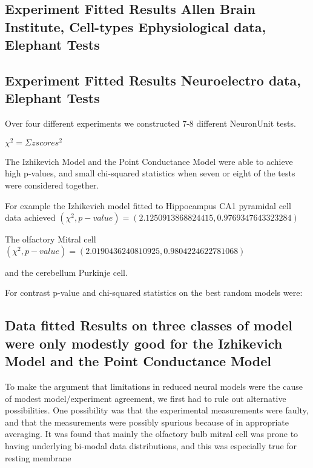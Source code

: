
\subsection{Experiment Fitted Results Allen Brain Institute, Cell-types Ephysiological data, Elephant Tests}


\subsection{Experiment Fitted Results Neuroelectro data, Elephant Tests}

Over four different experiments we constructed 7-8 different NeuronUnit tests. 

$\chi^{2}=\Sigma zscores^{2} $


The Izhikevich Model and the Point Conductance Model were able to achieve high p-values, and small chi-squared statistics when seven or eight of the tests were considered together.

For example the Izhikevich model fitted to Hippocampus CA1 pyramidal cell data achieved $ (\chi^{2} ,p-value) =(2.1250913868824415, 0.9769347643323284) $

The olfactory Mitral cell
$ (\chi^{2} ,p-value) =(2.0190436240810925, 0.9804224622781068) $

and the cerebellum Purkinje cell.


For contrast p-value and chi-squared statistics on the best random models were:

\subsection{Data fitted Results on three classes of model were only modestly good for the Izhikevich Model and the Point Conductance Model}

To make the argument that limitations in reduced neural models were the cause of modest model/experiment agreement, we first had to rule out alternative possibilities. One possibility was that the experimental measurements were faulty, and that the measurements were possibly spurious because of in appropriate averaging. It was found that mainly the olfactory bulb mitral cell was prone to having underlying bi-modal data distributions, and this was especially true for resting membrane

